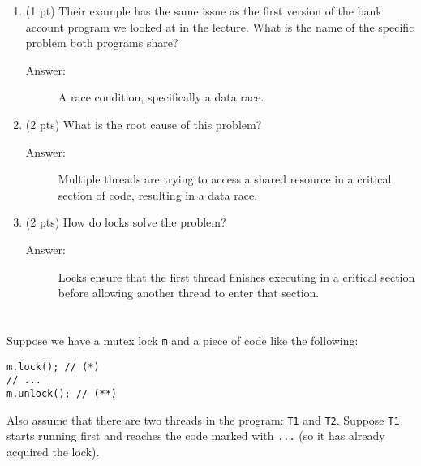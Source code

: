 \documentclass[11pt]{article}
\begin{document}
\begin{enumerate}
\item (1 pt) Their example has the same issue as the first version of the bank
account program we looked at in the lecture. What is the name of the specific problem both programs share?

\begin{description}
    \item[Answer:] A race condition, specifically a data race.
\end{description}

\item (2 pts) What is the root cause of this problem?

\begin{description}
    \item[Answer:] Multiple threads are trying to access a shared resource in a critical section of code, resulting in a data race.
\end{description}

\item (2 pts) How do locks solve the problem?

\begin{description}
    \item[Answer:] Locks ensure that the first thread finishes executing in a critical section before allowing another thread to enter that section.
\end{description}
\newpage
\end{enumerate}

\section{}
\label{sec:org5030ea7}
Suppose we have a mutex lock \texttt{m} and a piece of code like the following:

\begin{verbatim}
m.lock(); // (*)
// ...
m.unlock(); // (**)
\end{verbatim}

Also assume that there are two threads in the program: \texttt{T1} and \texttt{T2}. Suppose
\texttt{T1} starts running first and reaches the code marked with \texttt{...} (so it has already
acquired the lock).
\end{document}
